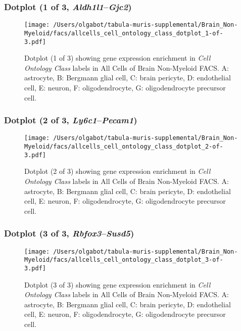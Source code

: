 \clearpage

\subsubsection{Dotplot (1 of 3, \emph{Aldh1l1}--\emph{Gjc2})}
\begin{figure}[h]
\centering
\texttt{[image: /Users/olgabot/tabula-muris-supplemental/Brain\_Non-Myeloid/facs/allcells\_cell\_ontology\_class\_dotplot\_1-of-3.pdf]}

\caption{ Dotplot (1 of 3)  showing gene expression enrichment in \emph{Cell Ontology Class} labels in All Cells of Brain Non-Myeloid FACS. A: astrocyte, B: Bergmann glial cell, C: brain pericyte, D: endothelial cell, E: neuron, F: oligodendrocyte, G: oligodendrocyte precursor cell.}
\end{figure}


\clearpage

\subsubsection{Dotplot (2 of 3, \emph{Ly6c1}--\emph{Pecam1})}
\begin{figure}[h]
\centering
\texttt{[image: /Users/olgabot/tabula-muris-supplemental/Brain\_Non-Myeloid/facs/allcells\_cell\_ontology\_class\_dotplot\_2-of-3.pdf]}

\caption{ Dotplot (2 of 3)  showing gene expression enrichment in \emph{Cell Ontology Class} labels in All Cells of Brain Non-Myeloid FACS. A: astrocyte, B: Bergmann glial cell, C: brain pericyte, D: endothelial cell, E: neuron, F: oligodendrocyte, G: oligodendrocyte precursor cell.}
\end{figure}


\clearpage

\subsubsection{Dotplot (3 of 3, \emph{Rbfox3}--\emph{Susd5})}
\begin{figure}[h]
\centering
\texttt{[image: /Users/olgabot/tabula-muris-supplemental/Brain\_Non-Myeloid/facs/allcells\_cell\_ontology\_class\_dotplot\_3-of-3.pdf]}

\caption{ Dotplot (3 of 3)  showing gene expression enrichment in \emph{Cell Ontology Class} labels in All Cells of Brain Non-Myeloid FACS. A: astrocyte, B: Bergmann glial cell, C: brain pericyte, D: endothelial cell, E: neuron, F: oligodendrocyte, G: oligodendrocyte precursor cell.}
\end{figure}


